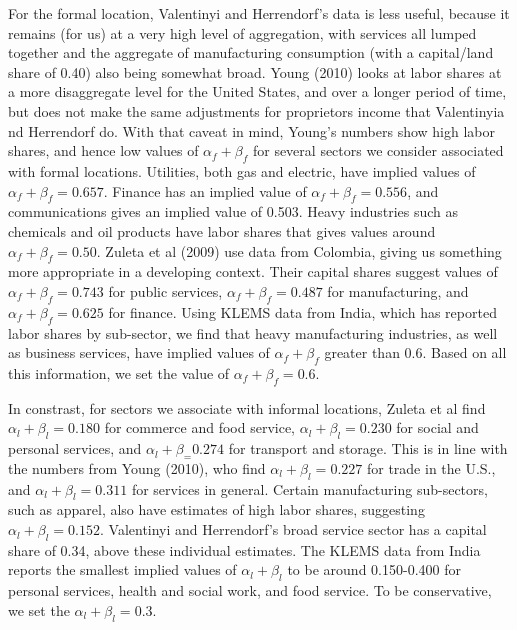\documentclass[10pt]{article}
\begin{document}
For the formal location, Valentinyi and Herrendorf's data is less useful, because it remains (for us) at a very high level of aggregation, with services all lumped together and the aggregate of manufacturing consumption (with a capital/land share of 0.40) also being somewhat broad. Young (2010) looks at labor shares at a more disaggregate level for the United States, and over a longer period of time, but does not make the same adjustments for proprietors income that Valentinyia nd Herrendorf do. With that caveat in mind, Young's numbers show high labor shares, and hence low values of $\alpha_f + \beta_f$ for several sectors we consider associated with formal locations. Utilities, both gas and electric, have implied values of $\alpha_f + \beta_f = 0.657$. Finance has an implied value of $\alpha_f + \beta_f = 0.556$, and communications gives an implied value of 0.503. Heavy industries such as chemicals and oil products have labor shares that gives values around $\alpha_f + \beta_f = 0.50$. Zuleta et al (2009) use data from Colombia, giving us something more appropriate in a developing context. Their capital shares suggest values of $\alpha_f + \beta_f = 0.743$ for public services, $\alpha_f + \beta_f = 0.487$ for manufacturing, and $\alpha_f + \beta_f = 0.625$ for finance. Using KLEMS data from India, which has reported labor shares by sub-sector, we find that heavy manufacturing industries, as well as business services, have implied values of $\alpha_f + \beta_f$ greater than 0.6. Based on all this information, we set the value of $\alpha_f + \beta_f = 0.6$.

In constrast, for sectors we associate with informal locations, Zuleta et al find $\alpha_l + \beta_l = 0.180$ for commerce and food service, $\alpha_l + \beta_l = 0.230$ for social and personal services, and $\alpha_l + \beta_ = 0.274$ for transport and storage. This is in line with the numbers from Young (2010), who find $\alpha_l + \beta_l = 0.227$ for trade in the U.S., and $\alpha_l + \beta_l = 0.311$ for services in general. Certain manufacturing sub-sectors, such as apparel, also have estimates of high labor shares, suggesting $\alpha_l + \beta_l = 0.152$. Valentinyi and Herrendorf's broad service sector has a capital share of 0.34, above these individual estimates. The KLEMS data from India reports the smallest implied values of $\alpha_l+\beta_l$ to be around 0.150-0.400 for personal services, health and social work, and food service. To be conservative, we set the $\alpha_l + \beta_l = 0.3$.
\end{document}
